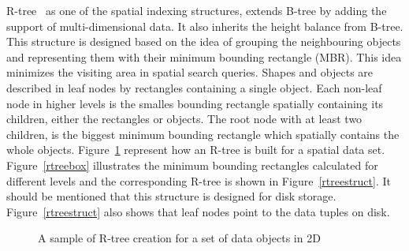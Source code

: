 \documentclass[a4paper,12pt]{article}
\begin{document}
R-tree~\cite{rtree} as one of the spatial indexing structures, extends B-tree by adding the support of multi-dimensional data. It also inherits the height balance from B-tree. This structure is designed based on the idea of grouping the neighbouring objects and representing them with their minimum bounding rectangle (MBR). This idea minimizes the visiting area in spatial search queries. Shapes and objects are described in leaf nodes by rectangles containing a single object. Each non-leaf node in higher levels is the smalles bounding rectangle spatially containing its children, either the rectangles or objects. The root node with at least two children, is the biggest minimum bounding rectangle which spatially contains the whole objects. Figure~\ref{rtree} represent how an R-tree is built for a spatial data set. Figure~\ref{rtreebox} illustrates the minimum bounding rectangles calculated for different levels
and the corresponding R-tree is shown in Figure~\ref{rtreestruct}.
It should be mentioned that this structure is designed for disk storage.
Figure~\ref{rtreestruct} also shows that leaf nodes point to the data tuples on disk.



\begin{figure}
\centering
{}
\centering
{}
\caption{A sample of R-tree creation for a set of data objects in 2D}
\label{rtree}
\end{figure}
\end{document}
